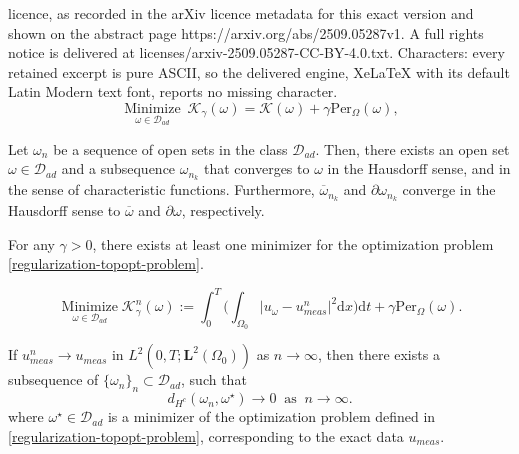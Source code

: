 \documentclass[10pt,a4paper]{amsart}
\def\L{\textbf{L}}
\newcommand{\dt} {\displaystyle\mathrm{d}t}
\newcommand{\dx} {\displaystyle\mathrm{d}x}
\begin{document}
licence, as recorded in the arXiv licence metadata for this exact version and shown on the abstract page https://arxiv.org/abs/2509.05287v1. A full rights notice is delivered at licenses/arxiv-2509.05287-CC-BY-4.0.txt. Characters: every retained excerpt is pure ASCII, so the delivered engine, XeLaTeX with its default Latin Modern text font, reports no missing character.
\begin{equation}\label{regularization-topopt-problem}
    \displaystyle\operatorname*{Minimize}_{\omega\in\mathcal{D}_{ad}}\
\mathcal{K}_\gamma(\omega) = \mathcal{K}(\omega)+\gamma\text{Per}_\Omega(\omega),
\end{equation}

\begin{lemma}\label{compacteness-D-ad}Let $\omega_n$ be a sequence of open sets in the class $\mathcal{D}_{ad}$. Then, there exists an open set 
$\omega \in\mathcal{D}_{ad}$ and a subsequence $\omega_{n_k}$ that converges to $\omega$ in the Hausdorff sense, and in the sense of characteristic functions. Furthermore,  $\overline{\omega}_{n_k}$ and $\partial \omega_{n_k}$ converge in the Hausdorff sense to $\overline{\omega}$ and $\partial \omega$, respectively.
\end{lemma}

\begin{theorem}\label{existence-optimal-solution}
For any $\gamma > 0$, there exists at least one minimizer for the optimization problem \eqref{regularization-topopt-problem}. \end{theorem}

\begin{equation}\label{reg-pertubed-optimi}
\operatorname*{Minimize}_{\omega\in \mathcal{D}_{ad}} \mathcal{K}^n_\gamma(\omega):=\int_0^T \big( \int_{\Omega_0} \big| u_\omega - u^n_{meas} \big|^2 \dx \big) \dt + \gamma \text{Per}_\Omega(\omega).
\end{equation}

\begin{theorem}\label{theorem-stability} If
$u_{meas}^n \longrightarrow u_{meas}$ in $L^2(0,T;\L^2(\Omega_0))$ as $n\longrightarrow \infty$, then there exists a subsequence of $\{\omega_n\}_n\subset\mathcal{D}_{ad}$, such that
$$d_{H^c}(\omega_n,\omega^\star)\longrightarrow0\;\; \text{as}\;\; n\longrightarrow\infty.$$
where $\omega^\star\in\mathcal{D}_{ad}$ is a minimizer of the optimization problem defined in \eqref{regularization-topopt-problem}, corresponding to the exact data $u_{meas}$.
\end{theorem}
\end{document}
